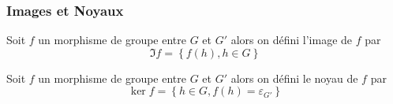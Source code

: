 \documentclass[11pt,colorlinks]{book}
\theoremstyle{mytheoremstyle}
\theoremstyle{mytheoremstyle}
\theoremstyle{mytheoremstyle}
\theoremstyle{mytheoremstyle}
\theoremstyle{mytheoremstyle}
\theoremstyle{mytheoremstyle}
\theoremstyle{mytheoremstyle}
\theoremstyle{mytheoremstyle}
\theoremstyle{myproblemstyle}
\begin{document}
\subsubsection{Images et Noyaux}
\begin{definition}
  Soit $f$ un morphisme de groupe entre $G$ et $G'$ alors on défini l'image de $f$ par 
  \begin{equation*}
    \Im f = \left\{f(h), h \in G\right\}
  \end{equation*}
\end{definition}
\begin{definition}
  Soit $f$ un morphisme de groupe entre $G$ et $G'$ alors on défini le noyau de $f$ par 
  \begin{equation*}
    \ker f = \left\{h \in G, f(h) = \varepsilon_{G'}\right\}
  \end{equation*}
\end{definition}
\end{document}
